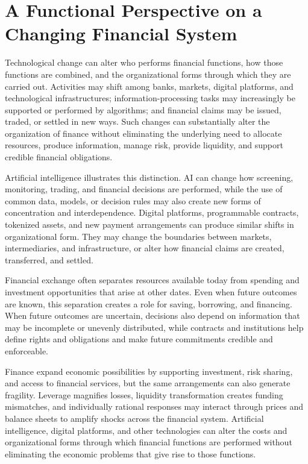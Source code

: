 \section{A Functional Perspective on a Changing Financial System}

Technological change can alter who performs financial functions, how those functions are combined, and the organizational forms through which they are carried out. Activities may shift among banks, markets, digital platforms, and technological infrastructures; information-processing tasks may increasingly be supported or performed by algorithms; and financial claims may be issued, traded, or settled in new ways. Such changes can substantially alter the organization of finance without eliminating the underlying need to allocate resources, produce information, manage risk, provide liquidity, and support credible financial obligations.

Artificial intelligence illustrates this distinction. AI can change how screening, monitoring, trading, and financial decisions are performed, while the use of common data, models, or decision rules may also create new forms of concentration and interdependence. Digital platforms, programmable contracts, tokenized assets, and new payment arrangements can produce similar shifts in organizational form. They may change the boundaries between markets, intermediaries, and infrastructure, or alter how financial claims are created, transferred, and settled. 


Financial exchange often separates resources available today from spending and investment opportunities that arise at other dates. Even when future outcomes are known, this separation creates a role for saving, borrowing, and financing. When future outcomes are uncertain, decisions also depend on information that may be incomplete or unevenly distributed, while contracts and institutions help define rights and obligations and make future commitments credible and enforceable.

Finance expand economic possibilities by supporting investment, risk sharing, and access to financial services, but the same arrangements can also generate fragility. Leverage magnifies losses, liquidity transformation creates funding mismatches, and individually rational responses may interact through prices and balance sheets to amplify shocks across the financial system. Artificial intelligence, digital platforms, and other technologies can alter the costs and organizational forms through which financial functions are performed without eliminating the economic problems that give rise to those functions.

